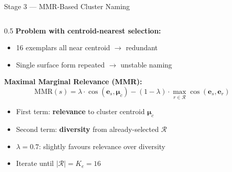 \documentclass[aspectratio=169,10pt]{beamer}
\begin{document}
\begin{frame}{Stage 3 — MMR-Based Cluster Naming}
  \begin{columns}[T]
    \begin{column}{0.5\textwidth}
      \textbf{Problem with centroid-nearest selection:}
      \begin{itemize}
        \item 16 exemplars all near centroid $\to$ redundant
        \item Single surface form repeated $\to$ unstable naming
      \end{itemize}

      \vspace{0.4em}
      \textbf{Maximal Marginal Relevance (MMR):}
      \[
        \text{MMR}(s) = \lambda \cdot \cos(\mathbf{e}_s,\boldsymbol{\mu}_c)
        - (1{-}\lambda)\cdot \max_{r\in\mathcal{R}} \cos(\mathbf{e}_s,\mathbf{e}_r)
      \]
      \begin{itemize}
        \item First term: \textbf{relevance} to cluster centroid $\boldsymbol{\mu}_c$
        \item Second term: \textbf{diversity} from already-selected $\mathcal{R}$
        \item $\lambda = 0.7$: slightly favours relevance over diversity
        \item Iterate until $|\mathcal{R}| = K_e = 16$
      \end{itemize}


\end{column}
\end{columns}
\end{frame}
\end{document}
